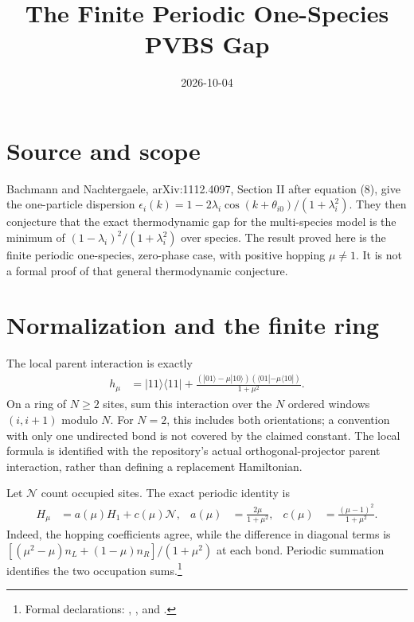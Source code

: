 \documentclass{article}
\title{The Finite Periodic One-Species PVBS Gap}
\author{}
\date{2026-10-04}
\begin{document}
\maketitle
{}

\section{Source and scope}
Bachmann and Nachtergaele, arXiv:1112.4097, Section II after equation (8),
give the one-particle dispersion
$\epsilon_i(k)=1-2\lambda_i\cos(k+\theta_{i0})/(1+\lambda_i^2)$.
They then conjecture that the exact thermodynamic gap for the multi-species
model is the minimum of $(1-\lambda_i)^2/(1+\lambda_i^2)$ over species.
The result proved here is the finite periodic one-species, zero-phase case,
with positive hopping $\mu\ne1$. It is not a formal proof of that general
thermodynamic conjecture.

\section{Normalization and the finite ring}
The local parent interaction is exactly
\begin{align}
    h_\mu & =|11\rangle\langle11|+
    \frac{(|01\rangle-\mu|10\rangle)
        (\langle01|-\mu\langle10|)}{1+\mu^2}.
    \label{eq:bn12_gap_local}
\end{align}
On a ring of $N\ge2$ sites, sum this interaction over the $N$ ordered
windows $(i,i+1)$ modulo $N$. For $N=2$, this includes both orientations;
a convention with only one undirected bond is not covered by the claimed
constant. The local formula is identified with the repository's actual
orthogonal-projector parent interaction, rather than defining a replacement
Hamiltonian.

Let $\mathcal N$ count occupied sites. The exact periodic identity is
\begin{align}
    H_\mu & =a(\mu)H_1+c(\mu)\mathcal N,
          & a(\mu)                       & =\frac{2\mu}{1+\mu^2},
          & c(\mu)                       & =\frac{(\mu-1)^2}{1+\mu^2}.
    \label{eq:bn12_gap_decomposition}
\end{align}
Indeed, the hopping coefficients agree, while the difference in diagonal
terms is $[(\mu^2-\mu)n_L+(1-\mu)n_R]/(1+\mu^2)$ at each bond.
Periodic summation identifies the two occupation sums.\footnote{Formal declarations:
    ,
    , and
    .}
\end{document}
